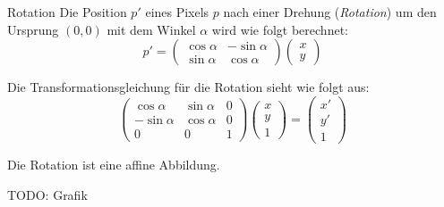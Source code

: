 \begin{defi}{Rotation}
    Die Position $p'$ eines Pixels $p$ nach einer Drehung (\emph{Rotation}) um den Ursprung $(0, 0)$ mit dem Winkel $\alpha$ wird wie folgt berechnet:
    \[
        p' =
        \begin{pmatrix}
            \cos \alpha & -\sin \alpha \\
            \sin \alpha & \cos \alpha
        \end{pmatrix}
        \begin{pmatrix}
            x \\
            y
        \end{pmatrix}
    \]

    Die Transformationsgleichung für die Rotation sieht wie folgt aus:
    \[
        \begin{pmatrix}
            \cos \alpha  & \sin \alpha & 0 \\
            -\sin \alpha & \cos \alpha & 0 \\
            0            & 0           & 1
        \end{pmatrix}
        \begin{pmatrix}
            x \\ y \\ 1
        \end{pmatrix}
        =
        \begin{pmatrix}
            x' \\ y' \\ 1
        \end{pmatrix}
    \]

    Die Rotation ist eine affine Abbildung.

    TODO: Grafik
\end{defi}

